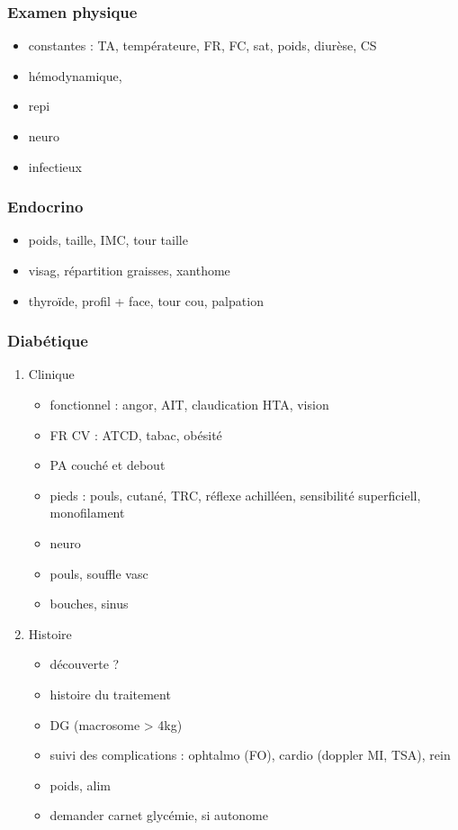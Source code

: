 \documentclass[11pt]{article}
\begin{document}
\subsubsection{Examen physique}
\label{sec:org338d661}
\begin{itemize}
\item constantes : TA, températeure, FR, FC, sat, poids, diurèse, CS
\item hémodynamique,
\item repi
\item neuro
\item infectieux
\end{itemize}
\subsubsection{Endocrino}
\label{sec:org964e22b}
\begin{itemize}
\item poids, taille, IMC, tour taille
\item visag, répartition graisses, xanthome
\item thyroïde, profil + face, tour cou, palpation
\end{itemize}
\subsubsection{Diabétique}
\label{sec:org840a4f2}
\begin{enumerate}
\item Clinique
\label{sec:org60ddc63}
\begin{itemize}
\item fonctionnel : angor, AIT, claudication HTA, vision
\item FR CV : ATCD, tabac, obésité
\item PA couché et debout
\item pieds : pouls, cutané, TRC, réflexe achilléen, sensibilité superficiell,
monofilament
\item neuro
\item pouls, souffle vasc
\item bouches, sinus
\end{itemize}
\item Histoire
\label{sec:org18d1fe3}
\begin{itemize}
\item découverte ?
\item histoire du traitement
\item DG (macrosome > 4kg)
\item suivi des complications : ophtalmo (FO), cardio (doppler MI, TSA), rein
\item poids, alim
\item demander carnet glycémie, si autonome
\end{itemize}
\end{enumerate}
\end{document}
